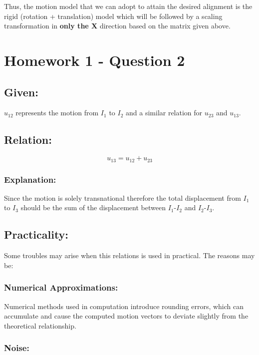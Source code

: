 \documentclass{article}
\begin{document}
Thus, the motion model that we can adopt to attain the desired alignment is the rigid (rotation + translation) model which will be followed by a scaling transformation in {\bf only the X} direction based on the matrix given above.

\newpage
\section{Homework 1 - Question 2}


\subsection*{Given:}

$u_{12}$ represents the motion from $I_1$ to $I_2$ and a similar relation for $u_{23}$ and $u_{13}$.

\subsection*{Relation:}
$$u_{13}=u_{12}+u_{23}$$


\subsubsection*{Explanation:} 

Since the motion is solely transnational therefore the total displacement from $I_1$ to $I_3$ should be the sum of the displacement between $I_1$-$I_2$ and $I_2$-$I_3$.


\subsection*{Practicality:}


Some troubles may arise when this relations is used in practical. The reasons may be:


\subsubsection*{Numerical Approximations:} 

Numerical methods used in computation introduce rounding errors, which can accumulate and cause the computed motion vectors to deviate slightly from the theoretical relationship.


\subsubsection*{Noise:} 
\end{document}
